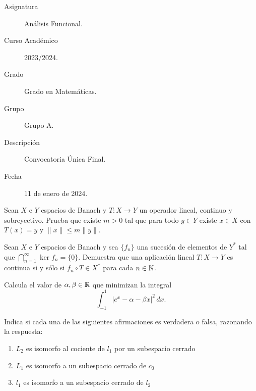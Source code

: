 \documentclass[12pt]{article}
\begin{document}

    
    

    \begin{description}
        \item[Asignatura] Análisis Funcional.
        \item[Curso Académico] 2023/2024.
        \item[Grado] Grado en Matemáticas.
        \item[Grupo] Grupo A.
        \item[Descripción] Convocatoria Única Final.
        \item[Fecha] 11 de enero de 2024.
    
    \end{description}
    \newpage


    
    \begin{ejercicio}
        Sean $X$ e $Y$ espacios de Banach y $T \colon X \longrightarrow Y$ un operador lineal, continuo y sobreyectivo. Prueba que existe $m > 0$ tal que para todo $y \in Y$ existe $x \in X$ con $T(x) = y$ y $\|x\| \leqslant m \|y\|$.
    \end{ejercicio}

    \begin{ejercicio}
        Sean $X$ e $Y$ espacios de Banach y sea $\{f_n\}$ una sucesión de elementos de $Y^*$ tal que $\bigcap\limits_{n=1}^\infty \ker f_n = \{0\}$. Demuestra que una aplicación lineal $T \colon X \longrightarrow Y$ es continua si y sólo si $f_n \circ T \in X^*$ para cada $n \in \mathbb{N}$.
    \end{ejercicio}

    \begin{ejercicio}
        Calcula el valor de $\alpha, \beta \in \mathbb{R}$ que minimizan la integral
        \[
            \int_{-1}^1 |e^x - \alpha - \beta x|^2 \, dx.
        \]
    \end{ejercicio}

    \begin{ejercicio}
        Indica si cada una de las siguientes afirmaciones es verdadera o falsa, razonando la respuesta:
        \begin{enumerate}[label=(\roman*)]
            \item $L_2$ es isomorfo al cociente de $l_1$ por un subespacio cerrado
            \item $L_1$ es isomorfo a un subespacio cerrado de $c_0$
            \item $l_1$ es isomorfo a un subespacio cerrado de $l_2$
        \end{enumerate}
    \end{ejercicio}
\end{document}
